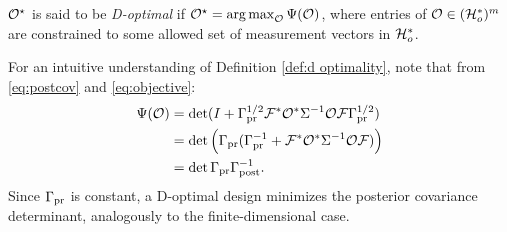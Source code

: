 \begin{definition}\label{def:d optimality}
  $\mathcal{O}^{\star}$ is said to be \emph{D-optimal} if $\mathcal{O}^{\star} =
  \operatorname*{arg\,max}_{\mathcal{O}} \Psi(\mathcal{O})$, where entries of $\mathcal{O} \in (\mathcal{H}_o^*)^m$ are constrained to
  some allowed set of measurement vectors in $\mathcal{H}_o^*$.
\end{definition}

\noindent For an intuitive understanding of Definition \ref{def:d
  optimality}, note that from \eqref{eq:postcov} and
\eqref{eq:objective}:
\begin{align*}
  \begin{split}
    \tar(\obs) &= \det ( I + \prcov^{1/2}  \fwd ^* \obs^* \Sigma^{-1} \obs \fwd \prcov^{1/2}) \\
    &= \det \Big( \prcov ( \prcov^{-1} + \fwd ^* \obs^* \Sigma^{-1} \obs \fwd) \Big )\\
    &= \det \prcov \postcov^{-1}.
  \end{split}
\end{align*}
Since $\Gamma_{\textup{pr}}$ is constant, a D-optimal design minimizes the posterior
covariance determinant, analogously to the finite-dimensional case.


